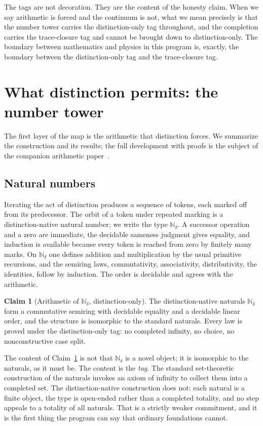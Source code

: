 \documentclass[11pt,a4paper]{article}
\theoremstyle{definition}
\newtheorem{claim}[theorem]{Claim}
\theoremstyle{remark}
\newcommand{\Ndelta}{\mathbb{N}_{\delta}}
\begin{document}
The tags are not decoration. They are the content of the honesty claim. When we
say arithmetic is forced and the continuum is not, what we mean precisely is that
the number tower carries the distinction-only tag throughout, and the completion
carries the trace-closure tag and cannot be brought down to distinction-only. The
boundary between mathematics and physics in this program is, exactly, the boundary
between the distinction-only tag and the trace-closure tag.

\section{What distinction permits: the number tower}\label{sec:arithmetic}

The first layer of the map is the arithmetic that distinction forces. We summarize
the construction and its results; the full development with proofs is the subject
of the companion arithmetic paper~\cite{DeltaArithmetic}.

\subsection{Natural numbers}

Iterating the act of distinction produces a sequence of tokens, each marked off
from its predecessor. The orbit of a token under repeated marking is a
distinction-native natural number; we write the type $\Ndelta$. A successor
operation and a zero are immediate, the decidable sameness judgment gives equality,
and induction is available because every token is reached from zero by finitely
many marks. On $\Ndelta$ one defines addition and multiplication by the usual
primitive recursions, and the semiring laws, commutativity, associativity,
distributivity, the identities, follow by induction. The order is decidable and
agrees with the arithmetic.

\begin{claim}[Arithmetic of $\Ndelta$, distinction-only]\label{cl:nat}
The distinction-native naturals $\Ndelta$ form a commutative semiring with
decidable equality and a decidable linear order, and the structure is isomorphic
to the standard naturals. Every law is proved under the distinction-only tag: no
completed infinity, no choice, no nonconstructive case split.
\end{claim}

The content of Claim~\ref{cl:nat} is not that $\Ndelta$ is a novel object; it is
isomorphic to the naturals, as it must be. The content is the \emph{tag}. The
standard set-theoretic construction of the naturals invokes an axiom of infinity to
collect them into a completed set. The distinction-native construction does not:
each natural is a finite object, the type is open-ended rather than a completed
totality, and no step appeals to a totality of all naturals. That is a strictly
weaker commitment, and it is the first thing the program can say that ordinary
foundations cannot.
\end{document}
